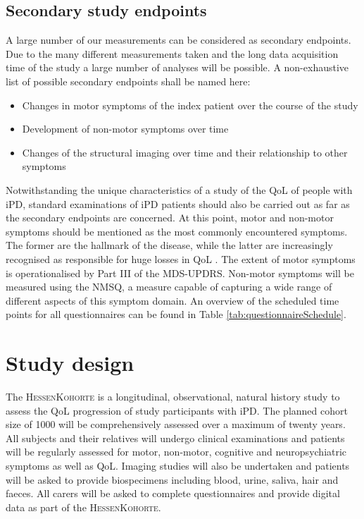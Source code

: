 \subsection{Secondary study endpoints}
A large number of our measurements can be considered as secondary endpoints. Due to the many different  measurements taken and the long data acquisition time of the study a large number of analyses will be possible. A non-exhaustive list of possible secondary endpoints shall be named here:
\begin{itemize}[noitemsep,topsep=0pt]
  \item{Changes in motor symptoms of the index patient over the course of the study}
  \item{Development of non-motor symptoms over time}
  \item{Changes of the structural imaging over time and their relationship
        to other symptoms} 
\end{itemize}
Notwithstanding the unique characteristics of a study of the \ac{QoL} of people with \ac{iPD}, standard examinations of \ac{iPD} patients should also be carried out as far as the secondary endpoints are concerned. At this point, motor and non-motor symptoms should be mentioned as the most commonly encountered symptoms. The former are the hallmark of the disease, while the latter are increasingly recognised as responsible for huge losses in \ac{QoL} \citep{klietz2020qol}. The extent of motor symptoms is operationalised by Part III of the \ac{MDS-UPDRS}\cite{goetz2007updrs}. Non-motor symptoms will be measured using the \ac{NMSQ}, a measure capable of capturing a wide range of different aspects of this symptom domain. An overview of the scheduled time points for all questionnaires can be found in Table \ref{tab:questionnaireSchedule}.

\section{Study design}
The \textsc{HessenKohorte} is a longitudinal, observational, natural history study to assess the \ac{QoL} progression of study participants with \ac{iPD}. The planned cohort size of \num[round-precision = 0, round-mode = places]{1000}{} will be comprehensively assessed over a maximum of twenty years. All subjects and their relatives will undergo clinical examinations and patients will be regularly assessed for motor, non-motor, cognitive and neuropsychiatric symptoms as well as \ac{QoL}. Imaging studies will also be undertaken and patients will be asked to provide biospecimens including blood, urine, saliva, hair and faeces. All carers will be asked to complete questionnaires and provide digital data as part of the \textsc{HessenKohorte}.

